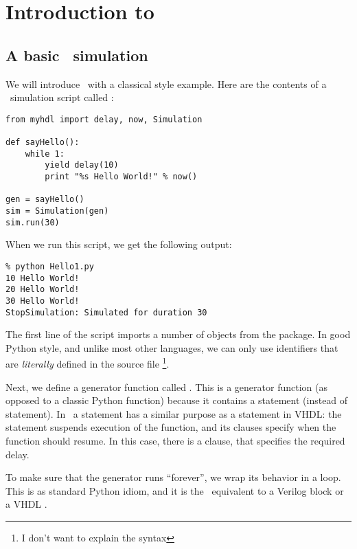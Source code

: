 \chapter{Introduction to \myhdl\ }

\section{A basic \myhdl\ simulation}

We will introduce \myhdl\ with a classical  style
example. Here are the contents of a \myhdl\ simulation script called
:

\begin{verbatim}
from myhdl import delay, now, Simulation

def sayHello():
    while 1:
        yield delay(10)
        print "%s Hello World!" % now()

gen = sayHello()
sim = Simulation(gen)
sim.run(30)

\end{verbatim}

When we run this script, we get the following output: 

\begin{verbatim}
% python Hello1.py
10 Hello World!
20 Hello World!
30 Hello World!
StopSimulation: Simulated for duration 30

\end{verbatim}

The first line of the script imports a
number of objects from the  package. In good Python style, and
unlike most other languages, we can only use identifiers that are
\emph{literally} defined in the source file \footnote{I don't want to
explain the  syntax}.

Next, we define a generator function called
. This is a generator function (as opposed to
a classic Python function) because it contains a 
statement (instead of  statement). In \myhdl\, a
 statement has a similar purpose as a 
statement in VHDL: the statement suspends execution of the function,
and its clauses specify when the function should resume. In this case,
there is a  clause, that specifies the required delay.

To make sure that the generator runs ``forever'', we wrap its behavior
in a  loop. This is as standard Python idiom, and it is
the \myhdl\ equivalent to a Verilog  block or a
VHDL .

